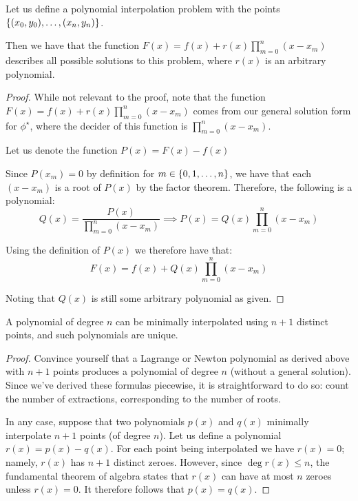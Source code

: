 \begin{theorem}
    Let us define a polynomial interpolation problem with the points $\{(x_0,y_0),\dots,(x_n,y_n)\}$.

    Then we have that the function $F(x)=f(x)+r(x)\prod_{m=0}^{n}{(x-x_m)}$ describes all possible solutions to this problem, where $r(x)$ is an arbitrary polynomial.

    \begin{proof}
        While not relevant to the proof, note that the function $F(x)=f(x)+r(x)\prod_{m=0}^{n}{(x-x_m)}$ comes from our general solution form for $\phi^\star$, where the decider of this function is $\prod_{m=0}^{n}{(x-x_m)}$.

        Let us denote the function $P(x)=F(x)-f(x)$

        Since $P(x_m)=0$ by definition for $m\in\{0,1,\dots,n\}$, we have that each $(x-x_m)$ is a root of $P(x)$ by the factor theorem. Therefore, the following is a polynomial:
        $$
            Q(x)=\frac{P(x)}{\prod_{m=0}^{n}{(x-x_m)}}\implies P(x)=Q(x)\prod_{m=0}^{n}{(x-x_m)}
        $$

        Using the definition of $P(x)$ we therefore have that:
        $$
            F(x)=f(x)+Q(x)\prod_{m=0}^{n}{(x-x_m)}
        $$

        Noting that $Q(x)$ is still some arbitrary polynomial as given.
    \end{proof}
\end{theorem}

\begin{theorem}
    A polynomial of degree $n$ can be minimally interpolated using $n+1$ distinct points, and such polynomials are unique.

    \begin{proof}
        Convince yourself that a Lagrange or Newton polynomial as derived above with $n+1$ points produces a polynomial of degree $n$ (without a general solution). Since we've derived these formulas piecewise, it is straightforward to do so: count the number of extractions, corresponding to the number of roots.

        In any case, suppose that two polynomials $p(x)$ and $q(x)$ minimally interpolate $n+1$ points (of degree $n$). Let us define a polynomial $r(x)=p(x)-q(x)$. For each point being interpolated we have $r(x)=0$; namely, $r(x)$ has $n+1$ distinct zeroes. However, since $\deg{r(x)}\leq n$, the fundamental theorem of algebra states that $r(x)$ can have at most $n$ zeroes unless $r(x)=0$. It therefore follows that $p(x)=q(x)$.
    \end{proof}
\end{theorem}

